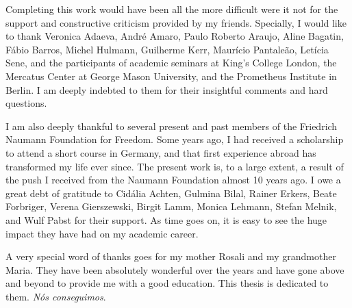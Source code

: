 \documentclass[a4paper,12pt]{report}
\begin{document}
Completing this work would have been all the more difficult were it not for the support and constructive criticism provided by my friends. Specially, I would like to thank Veronica Adaeva, André Amaro, Paulo Roberto Araujo, Aline Bagatin, Fábio Barros, Michel Hulmann, Guilherme Kerr, Maurício Pantaleão, Letícia Sene, and the participants of academic seminars at King's College London, the Mercatus Center at George Mason University, and the Prometheus Institute in Berlin. I am deeply indebted to them for their insightful comments and hard questions.

I am also deeply thankful to several present and past members of the Friedrich Naumann Foundation for Freedom. Some years ago, I had received a scholarship to attend a short course in Germany, and that first experience abroad has transformed my life ever since. The present work is, to a large extent, a result of the push I received from the Naumann Foundation almost 10 years ago. I owe a great debt of gratitude to Cidália Achten, Gulmina Bilal, Rainer Erkers, Beate Forbriger, Verena Gierszewski, Birgit Lamm, Monica Lehmann, Stefan Melnik, and Wulf Pabst for their support. As time goes on, it is easy to see the huge impact they have had on my academic career.

A very special word of thanks goes for my mother Rosali and my grandmother Maria. They have been absolutely wonderful over the years and have gone above and beyond to provide me with a good education. This thesis is dedicated to them. \textit{Nós conseguimos}. 


\newpage
{}
\tableofcontents
\listoftables
{}
{}
\listoffigures
{}
{}

\newpage
{}




\end{document}
